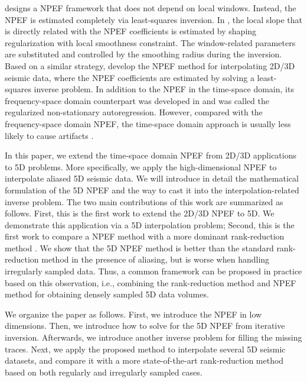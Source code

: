 \cite{fomel2002pwd} designs a NPEF framework that does not depend on local windows. Instead, the NPEF is estimated completely via least-squares inversion. In \cite{fomel2002pwd}, the local slope that is directly related with the NPEF coefficients is estimated by shaping regularization with local smoothness constraint.  The window-related parameters are substituted and controlled by the smoothing radius during the inversion.  Based on a similar strategy, \cite{liuyang2011rna} develop the NPEF method for interpolating 2D/3D seismic data, where the NPEF coefficients are estimated by solving a least-squares inverse problem. In addition to the NPEF in the time-space domain, its frequency-space domain counterpart was developed in \cite{guochang2012} and was called the regularized non-stationary autoregression. However, compared with the frequency-space domain NPEF, the time-space domain approach is usually less likely to cause artifacts \cite[]{abma1995,crawley2000seismic}. 

In this paper, we extend the time-space domain NPEF from 2D/3D applications to 5D problems.  More specifically, we apply the high-dimensional NPEF to interpolate aliased 5D seismic data.  We will introduce in detail the mathematical formulation of the 5D NPEF and the way to cast it into the interpolation-related inverse problem. 
The two main contributions of this work are summarized as follows. First, this is the first work to extend the 2D/3D NPEF to 5D. We demonstrate this application via a 5D interpolation problem; Second, this is the first work to compare a NPEF method with a more dominant rank-reduction method \cite[]{kreimer2012,jianjun2013,yangkang2016irr5d,oboue2021geo1}. We show that the 5D NPEF method is better than the standard rank-reduction method in the presence of aliasing, but is worse when handling irregularly sampled data. Thus, a common framework  can be proposed in practice based on this observation, i.e., combining the rank-reduction method and NPEF method for obtaining densely sampled 5D data volumes. 


We organize the paper as follows. First, we introduce the NPEF in low dimensions. Then, we introduce how to solve for the 5D NPEF from iterative inversion. Afterwards, we introduce another inverse problem for filling the missing traces. Next, we apply the proposed method to interpolate several 5D seismic datasets, and compare it with a more state-of-the-art rank-reduction method based on both regularly and irregularly sampled cases. 


